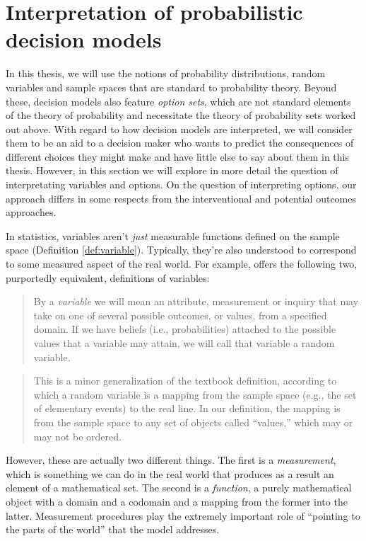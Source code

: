 \section{Interpretation of probabilistic decision models}\label{sec:interp_of_dms}

In this thesis, we will use the notions of probability distributions, random variables and sample spaces that are standard to probability theory. Beyond these, decision models also feature \emph{option sets}, which are not standard elements of the theory of probability and necessitate the theory of probability sets worked out above. With regard to how decision models are interpreted, we will consider them to be an aid to a decision maker who wants to predict the consequences of different choices they might make and have little else to say about them in this thesis. However, in this section we will explore in more detail the question of interpretating variables and options. On the question of interpreting options, our approach differs in some respects from the interventional and potential outcomes approaches.

In statistics, variables aren't \emph{just} measurable functions defined on the sample space (Definition \ref{def:variable}). Typically, they're also understood to correspond to some measured aspect of the real world. For example, \citet{pearl_causality:_2009} offers the following two, purportedly equivalent, definitions of variables:
\begin{quote}
By a \emph{variable} we will mean an attribute, measurement or inquiry that may take on one of several possible outcomes, or values, from a specified domain. If we have beliefs (i.e., probabilities) attached to the possible values that a variable may attain, we will call that variable a random variable.
\end{quote}

\begin{quote}
This is a minor generalization of the textbook definition, according to which a random variable is a mapping from the sample space (e.g., the set of elementary events) to the real line. In our definition, the mapping is from the sample space to any set of objects called ``values,'' which may or may not be ordered.
\end{quote}

However, these are actually two different things. The first is a \emph{measurement}, which is something we can do in the real world that produces as a result an element of a mathematical set. The second is a \emph{function}, a purely mathematical object with a domain and a codomain and a mapping from the former into the latter. Measurement procedures play the extremely important role of ``pointing to the parts of the world'' that the model addresses.

